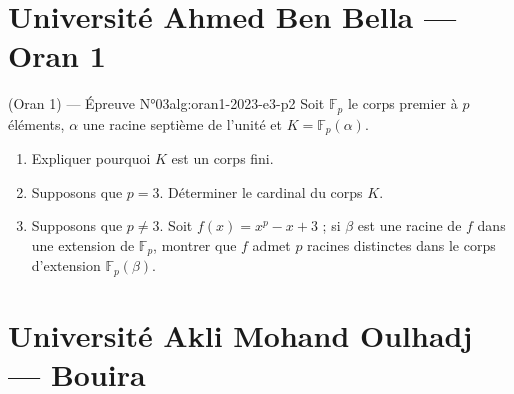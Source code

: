 \section{Université Ahmed Ben Bella --- Oran 1}

\begin{problem}{(Oran 1) — Épreuve N°03}{alg:oran1-2023-e3-p2}
Soit $\mathbb{F}_p$ le corps premier à $p$ éléments, $\alpha$ une racine septième de
l'unité et $K = \mathbb{F}_p(\alpha)$.
\begin{enumerate}
\item Expliquer pourquoi $K$ est un corps fini.
\item Supposons que $p = 3$. Déterminer le cardinal du corps $K$.
\item Supposons que $p \neq 3$. Soit $f(x) = x^p - x + 3$ ; si $\beta$ est une racine
      de $f$ dans une extension de $\mathbb{F}_p$, montrer que $f$ admet $p$ racines
      distinctes dans le corps d'extension $\mathbb{F}_p(\beta)$.
\end{enumerate}

\end{problem}

\newpage

\section{Université Akli Mohand Oulhadj --- Bouira}

